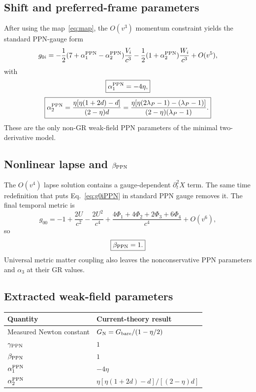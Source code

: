 \documentclass[11pt]{article}
\newcommand{\GN}{G_{\rm N}}
\newcommand{\Gb}{G_{\rm bare}}
\newcommand{\aone}{\alpha_1^{\rm PPN}}
\newcommand{\atwo}{\alpha_2^{\rm PPN}}
\newcommand{\bppn}{\beta_{\rm PPN}}
\begin{document}
\subsection{Shift and preferred-frame parameters}

After using the map~\eqref{eq:map}, the $O(v^3)$ momentum constraint yields the standard PPN-gauge form
\begin{equation}
g_{0i}=-\frac12(7+\aone-\atwo)\frac{V_i}{c^3}
-\frac12(1+\atwo)\frac{W_i}{c^3}+O(v^5),
\label{eq:g0iPPN}
\end{equation}
with
\begin{equation}
\boxed{\aone=-4\eta,}
\label{eq:a1}
\end{equation}
\begin{equation}
\boxed{\atwo=\frac{\eta[\eta(1+2d)-d]}{(2-\eta)d}
=\frac{\eta[\eta(2\lambda_P-1)-(\lambda_P-1)]}
{(2-\eta)(\lambda_P-1)}.}
\label{eq:a2}
\end{equation}
These are the only non-GR weak-field PPN parameters of the minimal two-derivative model.

\subsection{Nonlinear lapse and $\beta_{\rm PPN}$}

The $O(v^4)$ lapse solution contains a gauge-dependent $\partial_t^2X$ term.  The same time redefinition that puts Eq.~\eqref{eq:g0iPPN} in standard PPN gauge removes it.  The final temporal metric is
\begin{equation}
g_{00}=-1+\frac{2U}{c^2}-\frac{2U^2}{c^4}
+\frac{4\Phi_1+4\Phi_2+2\Phi_3+6\Phi_4}{c^4}+O(v^6),
\label{eq:g00PPN}
\end{equation}
so
\begin{equation}
\boxed{\bppn=1.}
\end{equation}
Universal metric matter coupling also leaves the nonconservative PPN parameters and $\alpha_3$ at their GR values.

\subsection{Extracted weak-field parameters}

\begin{center}
\begin{tabular}{@{}>{\raggedright\arraybackslash}p{}p{}@{}}
\toprule
Quantity & Current-theory result \\
\midrule
Measured Newton constant & $\displaystyle \GN=\Gb/(1-\eta/2)$ \\
$\gamma_{\rm PPN}$ & $1$ \\
$\beta_{\rm PPN}$ & $1$ \\
$\alpha_1^{\rm PPN}$ & $-4\eta$ \\
$\alpha_2^{\rm PPN}$ & $\displaystyle \eta[\eta(1+2d)-d]/[(2-\eta)d]$ \\
\bottomrule
\end{tabular}
\end{center}
\end{document}
